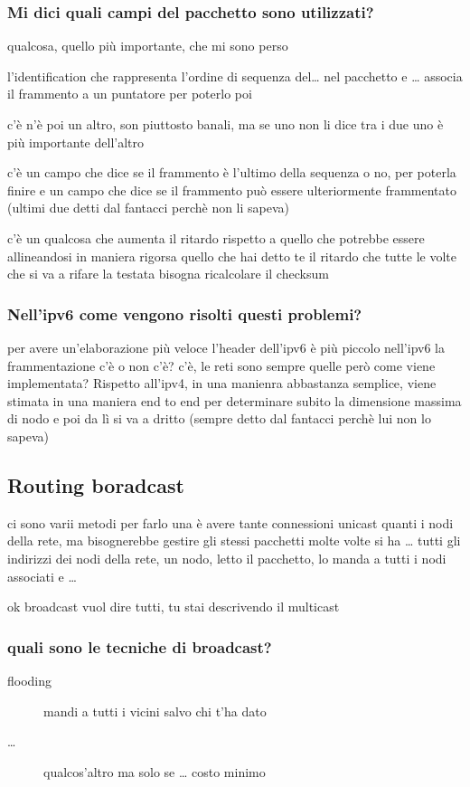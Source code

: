 \documentclass[11pt]{article}
\begin{document}
\subsubsection{Mi dici quali campi del pacchetto sono utilizzati?}
\label{sec:orgd68bfd3}
qualcosa, quello più importante, che mi sono perso

l'identification che rappresenta l'ordine di sequenza del\ldots{} nel pacchetto e \ldots{}
associa il frammento a un puntatore per poterlo poi

c'è n'è poi un altro, son piuttosto banali, ma se uno non li dice
tra i due uno è più importante dell'altro

c'è un campo che dice se il frammento è l'ultimo della sequenza o no, per poterla finire
e un campo che dice se il frammento può essere ulteriormente frammentato
(ultimi due detti dal fantacci perchè non li sapeva)

c'è un qualcosa che aumenta il ritardo rispetto a quello che potrebbe essere allineandosi in maniera rigorsa quello che hai detto te
il ritardo che tutte le volte che si va a rifare la testata bisogna ricalcolare il checksum

\subsubsection{Nell'ipv6 come vengono risolti questi problemi?}
\label{sec:org4ea0d3d}
per avere un'elaborazione più veloce l'header dell'ipv6 è più piccolo
nell'ipv6 la frammentazione c'è o non c'è? c'è, le reti sono sempre quelle
però come viene implementata? Rispetto all'ipv4, in una manienra abbastanza semplice, viene stimata in una maniera end to end per determinare subito la dimensione massima di nodo e poi da lì si va a dritto
(sempre detto dal fantacci perchè lui non lo sapeva)

\subsection{Routing boradcast}
\label{sec:org27d3389}
ci sono varii metodi per farlo
una è avere tante connessioni unicast quanti i nodi della rete, ma bisognerebbe gestire gli stessi pacchetti molte volte
si ha \ldots{} tutti gli indirizzi dei nodi della rete, un nodo, letto il pacchetto, lo manda a tutti i nodi associati e \ldots{}

ok broadcast vuol dire tutti, tu stai descrivendo il multicast

\subsubsection{quali sono le tecniche di broadcast?}
\label{sec:org2d38312}
\begin{description}
\item[{flooding}] mandi a tutti i vicini salvo chi t'ha dato
\item[{\ldots{}}] qualcos'altro ma solo se \ldots{} costo minimo
\end{description}
\end{document}
